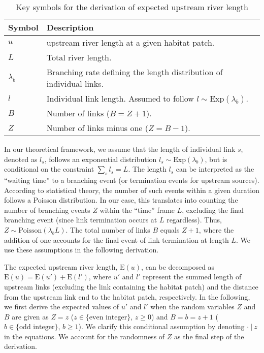 \documentclass[11pt, class=article, crop=false]{standalone}
\begin{document}
\begin{table}
    \centering
    \caption{Key symbols for the derivation of expected upstream river length}
    \begin{tabularx}{\textwidth}{ll}
        Symbol & Description\\
        \hline
        $u$ & upstream river length at a given habitat patch.\\
        $L$ & Total river length.\\
        $\lambda_b$ & Branching rate defining the length distribution of individual links.\\
        $l$ & Individual link length. Assumed to follow $l \sim \mbox{Exp}(\lambda_b)$.\\
        $B$ & Number of links ($B = Z + 1$).\\
        $Z$ & Number of links minus one ($Z = B - 1$).\\
        \hline
    \end{tabularx}
    \label{tab:key-symbol}
\end{table}

In our theoretical framework, we assume that the length of individual link $s$, denoted as $l_s$, follows an exponential distribution $l_s \sim \mbox{Exp}(\lambda_b)$, but is conditional on the constraint $\sum_s l_s = L$.
The length $l_s$ can be interpreted as the ``waiting time'' to a branching event (or termination events for upstream sources).
According to statistical theory, the number of such events within a given duration follows a Poisson distribution.
In our case, this translates into counting the number of branching events $Z$ within the ``time'' frame $L$, excluding the final branching event (since link termination occurs at $L$ regardless).
Thus, $Z \sim \mbox{Poisson}(\lambda_b L)$.
The total number of links $B$ equals $Z + 1$, where the addition of one accounts for the final event of link termination at length $L$.
We use these assumptions in the following derivation.

The expected upstream river length, $\mbox{E}(u)$, can be decomposed as $\mbox{E}(u) = \mbox{E}(u') + \mbox{E}(l')$, where $u'$ and $l'$ represent the summed length of upstream links (excluding the link containing the habitat patch) and the distance from the upstream link end to the habitat patch, respectively.
In the following, we first derive the expected values of $u'$ and $l'$ when the random variables $Z$ and $B$ are given as $Z = z$ ($z \in \{\text{even integer}\}$, $z \ge 0$) and $B = b = z + 1$ ($b \in \{\text{odd integer}\}$, $b \ge 1$).
We clarify this conditional assumption by denoting $\cdot ~|~ z$ in the equations.
We account for the randomness of $Z$ as the final step of the derivation.
\end{document}
